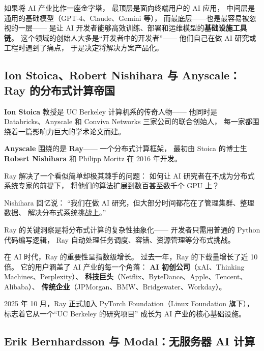 如果将 AI 产业比作一座金字塔，
最顶层是面向终端用户的 AI 应用，
中间层是通用的基础模型（GPT-4、Claude、Gemini 等），
而最底层——也是最容易被忽视的一层——
是让 AI 开发者能够高效训练、部署和运维模型的\textbf{基础设施工具链}。
这个领域的创始人大多是``开发者中的开发者''——
他们自己在做 AI 研究或工程时遇到了痛点，
于是决定将解决方案产品化。


\subsection{Ion Stoica、Robert Nishihara 与 Anyscale：Ray 的分布式计算帝国}
\label{subsec:anyscale-ray}

\textbf{Ion Stoica} 教授是 UC Berkeley 计算机系的传奇人物——
他同时是 Databricks、Anyscale 和 Conviva Networks 三家公司的联合创始人，
每一家都围绕着一篇影响力巨大的学术论文而建。

\textbf{Anyscale} 围绕的是 \textbf{Ray}——
一个分布式计算框架，
最初由 Stoica 的博士生 \textbf{Robert Nishihara}
和 Philipp Moritz 在 2016 年开发。

\begin{whybox}
Ray 解决了一个看似简单却极其棘手的问题：
如何让 AI 研究者在不成为分布式系统专家的前提下，
将他们的算法扩展到数百甚至数千个 GPU 上？

Nishihara 回忆说：
``我们在做 AI 研究，但大部分时间都花在了管理集群、整理数据、
解决分布式系统挑战上。''

Ray 的关键洞察是将分布式计算的复杂性抽象化——
开发者只需用普通的 Python 代码编写逻辑，
Ray 自动处理任务调度、容错、资源管理等分布式挑战。
\end{whybox}

在 AI 时代，Ray 的重要性呈指数级增长。
过去一年，Ray 的下载量增长了近 10 倍。
它的用户涵盖了 AI 产业的每一个角落：
\textbf{AI 初创公司}（xAI、Thinking Machines、Perplexity）、
\textbf{科技巨头}（Netflix、ByteDance、Apple、Tencent、Alibaba）、
\textbf{传统企业}（JPMorgan、BMW、Bridgewater、Workday）。

2025 年 10 月，Ray 正式加入 PyTorch Foundation（Linux Foundation 旗下），
标志着它从一个``UC Berkeley 的研究项目''
成长为 AI 产业的核心基础设施。


\subsection{Erik Bernhardsson 与 Modal：无服务器 AI 计算}
\label{subsec:erik-bernhardsson}

